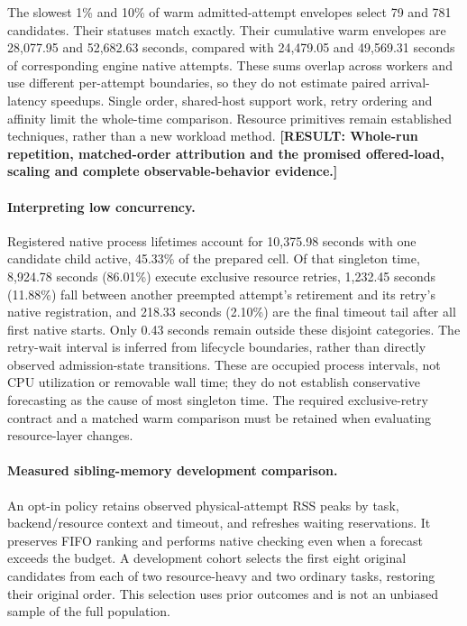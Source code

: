 \documentclass[10pt,twocolumn]{article}
\newcommand{\missing}[1]{\textbf{[RESULT: #1]}}
\begin{document}
The slowest 1\% and 10\% of warm admitted-attempt envelopes select 79 and
781 candidates. Their statuses match exactly. Their cumulative warm envelopes
are 28,077.95 and 52,682.63 seconds, compared with 24,479.05 and 49,569.31
seconds of corresponding engine native attempts. These sums overlap across
workers and use different per-attempt boundaries, so they do not estimate
paired arrival-latency speedups. Single order, shared-host support work,
retry ordering and affinity limit the whole-time comparison. Resource
primitives remain established techniques, rather than a new workload method.
\missing{Whole-run repetition, matched-order attribution and the promised
offered-load, scaling and complete observable-behavior evidence.}

\paragraph{Interpreting low concurrency.}
Registered native process lifetimes account for 10,375.98 seconds with one
candidate child active, 45.33\% of the prepared cell.
Of that singleton time, 8,924.78 seconds (86.01\%) execute exclusive resource
retries, 1,232.45 seconds (11.88\%) fall between another preempted attempt's
retirement and its retry's native registration, and 218.33 seconds (2.10\%)
are the final timeout tail after all first native starts.
Only 0.43 seconds remain outside these disjoint categories.
The retry-wait interval is inferred from lifecycle boundaries, rather than
directly observed admission-state transitions.
These are occupied process intervals, not CPU utilization or removable wall
time; they do not establish conservative forecasting as the cause of most
singleton time. The required exclusive-retry contract and a matched warm
comparison must be retained when evaluating resource-layer changes.

\paragraph{Measured sibling-memory development comparison.}
An opt-in policy retains observed physical-attempt RSS peaks by task,
backend/resource context and timeout, and refreshes waiting reservations.
It preserves FIFO ranking and performs native checking even when a forecast
exceeds the budget. A development cohort selects the first eight original
candidates from each of two resource-heavy and two ordinary tasks, restoring
their original order. This selection uses prior outcomes and is not an unbiased
sample of the full population.
\end{document}
